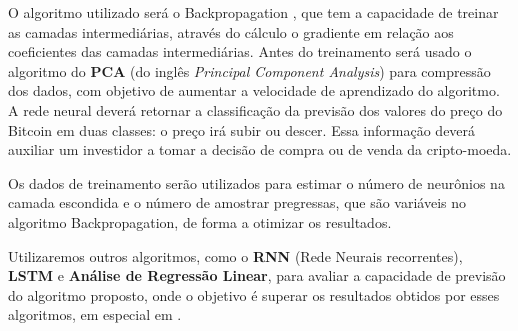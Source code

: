 O algoritmo utilizado será o Backpropagation \cite{hecht1992theory}, que tem a capacidade de treinar as camadas intermediárias, através do cálculo o gradiente em relação aos coeficientes das camadas intermediárias. Antes do treinamento será usado o algoritmo do \textbf{PCA} \cite{Jolliffe:1986} (do inglês \emph{Principal Component Analysis}) para compressão dos dados, com objetivo de aumentar a velocidade de aprendizado do algoritmo. A rede neural deverá retornar a classificação da previsão dos valores do preço do Bitcoin em duas classes: o preço irá subir ou descer. Essa informação deverá auxiliar um investidor a tomar a decisão de compra ou de venda da cripto-moeda.


Os dados de treinamento serão utilizados para estimar o número de neurônios na camada escondida e o número de amostrar pregressas, que são variáveis no algoritmo Backpropagation, de forma a otimizar os resultados. 

Utilizaremos outros algoritmos, como o \textbf{RNN} (Rede Neurais recorrentes), \textbf{LSTM}  e \textbf{Análise de Regressão Linear}, para avaliar a capacidade de previsão do algoritmo proposto, onde o objetivo é superar os resultados obtidos por esses algoritmos, em especial em \cite{mcnally2016predicting}.